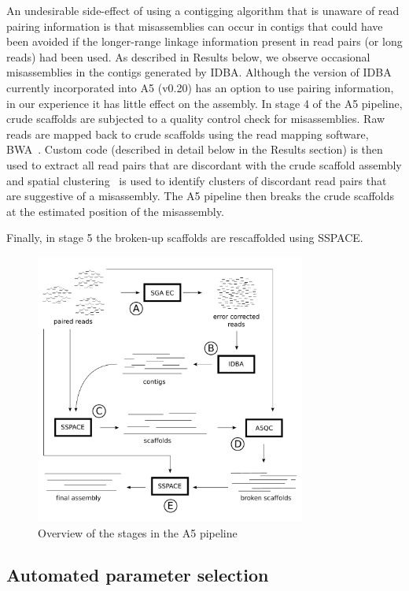 \documentclass{bioinfo}
\begin{document}
\begin{methods}
An undesirable side-effect of using a contigging algorithm that is unaware of read pairing information is that misassemblies can occur in contigs that could have been avoided if the longer-range linkage information present in read pairs (or long reads) had been used.  As described in Results below, we observe occasional misassemblies in the contigs generated by IDBA. Although the version of IDBA currently incorporated into A5 (v0.20) has an option to use pairing information, in our experience it has little effect on the assembly. In stage 4 of the A5 pipeline, crude scaffolds are subjected to a quality control check for misassemblies. Raw reads are mapped back to crude scaffolds using the read mapping software,
BWA~\citep{bwa}. Custom code (described in detail below in the Results section) is then used to extract all read pairs that are discordant with the crude scaffold assembly and spatial clustering~\citep{DBSCAN} is used to identify clusters of discordant read pairs that are suggestive of a misassembly. The A5 pipeline then breaks the crude scaffolds at the estimated position of the misassembly.

Finally, in stage 5 the broken-up scaffolds are rescaffolded using SSPACE.
\end{methods}


\begin{figure}[t]
\includegraphics[width=3.5in]{a5pipeline-diagram.pdf}
\vspace{-1cm}
\caption{Overview of the stages in the A5 pipeline}\label{fig:01}
\end{figure}

\subsection{Automated parameter selection}
\end{document}

